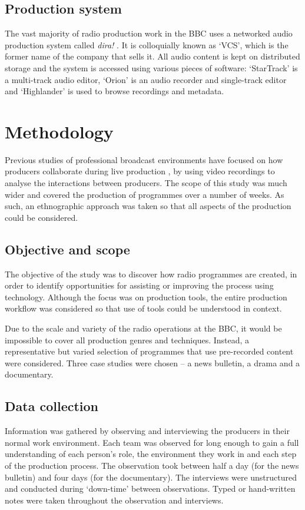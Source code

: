 \subsection{Production system}
The vast majority of radio production work in the BBC uses a networked audio
production system called \textit{dira!} \citep{SCISYS2015}. It is colloquially
known as `VCS', which is the former name of the company that sells it. All
audio content is kept on distributed storage and the system is accessed using
various pieces of software: `StarTrack' is a multi-track audio editor, `Orion'
is an audio recorder and single-track editor and `Highlander' is used to browse
recordings and metadata. 

\section{Methodology}\label{sec:method}
Previous studies of professional broadcast environments have focused on how
producers collaborate during live production \citep{Engstroem2010,Perry2009}, by
using video recordings to analyse the interactions between producers. The scope
of this study was much wider and covered the production of programmes over a
number of weeks. As such, an ethnographic approach was taken so that all
aspects of the production could be considered.

\subsection{Objective and scope}
The objective of the study was to discover how radio programmes are created, in
order to identify opportunities for assisting or improving the process using
technology. Although the focus was on production tools, the entire production
workflow was considered so that use of tools could be understood in context.

Due to the scale and variety of the radio operations at the BBC, it would be
impossible to cover all production genres and techniques.  Instead, a
representative but varied selection of programmes that use pre-recorded content
were considered. Three case studies were chosen --  a news bulletin, a drama
and a documentary.

\subsection{Data collection}
Information was gathered by observing and interviewing the producers in their
normal work environment. Each team was observed for long enough to gain a full
understanding of each person's role, the environment they work in and each step
of the production process. The observation took between half a day (for the
news bulletin) and four days (for the documentary). The interviews were
unstructured and conducted during `down-time' between observations.  Typed or
hand-written notes were taken throughout the observation and interviews.

